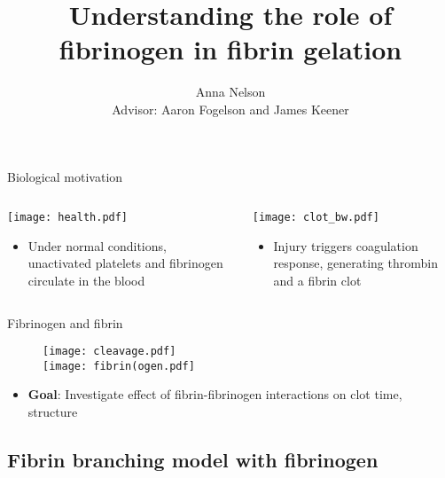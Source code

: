 \documentclass[10pt]{beamer}
\title{Understanding the role of fibrinogen in fibrin gelation}
\date{}
\author{Anna Nelson\\ Advisor: Aaron Fogelson and James Keener}
\institute{University of Utah}
\begin{document}
\maketitle



\begin{frame}[plain]{Biological motivation}

\noindent
\hspace{-4cm}
\begin{columns}
\begin{column}{0.5\textwidth}
\texttt{[image: health.pdf]}
\begin{itemize}
\item Under normal conditions, unactivated platelets and fibrinogen circulate in the blood
\end{itemize}
\end{column}
\begin{column}{0.5\textwidth}
\texttt{[image: clot\_bw.pdf]}
\begin{itemize}
\item Injury triggers coagulation response, generating thrombin and a fibrin clot
\end{itemize}
\end{column}
\end{columns}
\end{frame}

\begin{frame}[fragile]{Fibrinogen and fibrin}
\begin{figure}
\texttt{[image: cleavage.pdf]}\\
\texttt{[image: fibrin(ogen.pdf]}
\end{figure}
\begin{itemize}
\item{\textbf{Goal}: Investigate effect of fibrin-fibrinogen interactions on clot time, structure}
\end{itemize}
\end{frame}

\subsection{Fibrin branching model with fibrinogen}
\end{document}
